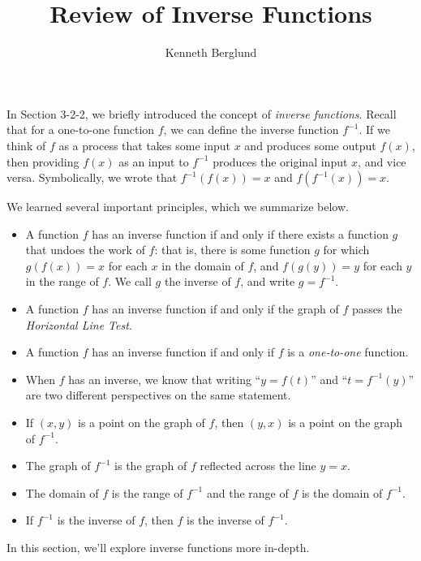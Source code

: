 \documentclass[nooutcomes]{ximera}
\author{Kenneth Berglund}
\title{Review of Inverse Functions}
\begin{document}
\begin{abstract}
  
\end{abstract}
\maketitle





In Section 3-2-2, we briefly introduced the concept of \emph{inverse functions}. Recall that for a one-to-one function $f$, we can define the inverse function $f^{-1}$. If we think of $f$ as a process that takes some input $x$ and produces some output $f(x)$, then providing $f(x)$ as an input to $f^{-1}$ produces the original input $x$, and vice versa. Symbolically, we wrote that $f^{-1}(f(x)) = x$ and $f(f^{-1}(x)) = x$. 

We learned several important principles, which we summarize below.
\begin{itemize}
\item
A function $f$ has an inverse function if and only if there exists a function $g$ that undoes the work of $f$: that is, there is some function $g$ for which $g(f(x)) = x$ for each $x$ in the domain of $f$, and $f(g(y)) = y$ for each $y$ in the range of $f$. We call $g$ the inverse of $f$, and write $g = f^{-1}$.%
\item
A function $f$ has an inverse function if and only if the graph of $f$ passes the {\it Horizontal Line Test}.
\item
A function $f$ has an inverse function if and only if $f$ is a {\it one-to-one} function.
\item
When $f$ has an inverse, we know that writing ``$y = f(t)$'' and ``$t = f^{-1}(y)$''  are two different perspectives on the same statement.
\item If $(x, y)$ is a point on the graph of $f$, then $(y, x)$ is a point on the graph of $f^{-1}$. 
\item The graph of $f^{-1}$ is the graph of $f$ reflected across the line $y = x$.
\item The domain of $f$ is the range of $f^{-1}$ and the range of $f$ is the domain of $f^{-1}$.
\item If $f^{-1}$ is the inverse of $f$, then $f$ is the inverse of $f^{-1}$.

\end{itemize}

In this section, we'll explore inverse functions more in-depth.
\end{document}
